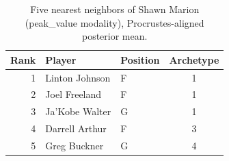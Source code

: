 \begin{table}[htbp]
  \centering\small
  \begin{tabular}{rllc}
    \toprule
    Rank & Player & Position & Archetype \\
    \midrule
    1 & Linton Johnson & F & 1 \\
    2 & Joel Freeland & F & 1 \\
    3 & Ja'Kobe Walter & G & 1 \\
    4 & Darrell Arthur & F & 3 \\
    5 & Greg Buckner & G & 4 \\
    \bottomrule
  \end{tabular}
  \caption{Five nearest neighbors of Shawn Marion (peak_value modality), Procrustes-aligned posterior mean.}
  \label{tab:Shawn_Marion_neighbors_peak_value}
\end{table}

